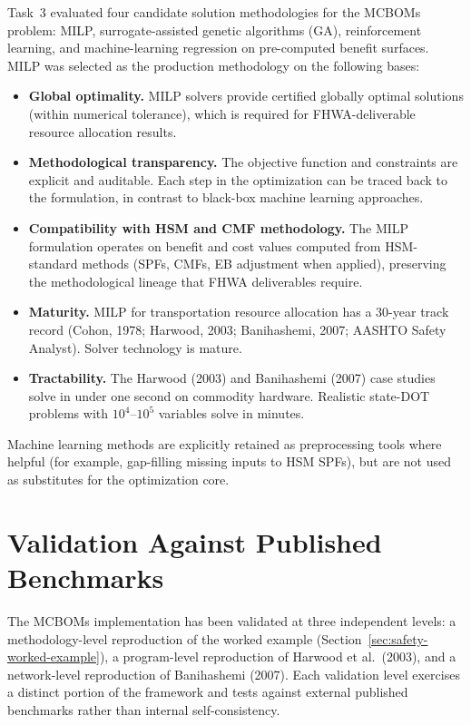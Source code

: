 Task~3 evaluated four candidate solution methodologies for the MCBOMs
problem: MILP, surrogate-assisted genetic algorithms (GA), reinforcement
learning, and machine-learning regression on pre-computed benefit surfaces.
MILP was selected as the production methodology on the following bases:

\begin{itemize}[leftmargin=2em, itemsep=2pt]
  \item \textbf{Global optimality.} MILP solvers provide certified globally
    optimal solutions (within numerical tolerance), which is required for
    FHWA-deliverable resource allocation results.
  \item \textbf{Methodological transparency.} The objective function and
    constraints are explicit and auditable. Each step in the optimization
    can be traced back to the formulation, in contrast to black-box machine
    learning approaches.
  \item \textbf{Compatibility with HSM and CMF methodology.} The MILP
    formulation operates on benefit and cost values computed from
    HSM-standard methods (SPFs, CMFs, EB adjustment when applied),
    preserving the methodological lineage that FHWA deliverables require.
  \item \textbf{Maturity.} MILP for transportation resource allocation has
    a 30-year track record (Cohon, 1978; Harwood, 2003; Banihashemi, 2007;
    AASHTO Safety Analyst). Solver technology is mature.
  \item \textbf{Tractability.} The Harwood (2003) and Banihashemi (2007)
    case studies solve in under one second on commodity hardware. Realistic
    state-DOT problems with $10^4$--$10^5$ variables solve in minutes.
\end{itemize}

Machine learning methods are explicitly retained as preprocessing tools
where helpful (for example, gap-filling missing inputs to HSM SPFs), but are
not used as substitutes for the optimization core.

\section{Validation Against Published Benchmarks}
\label{sec:validation}

The MCBOMs implementation has been validated at three independent levels: a
methodology-level reproduction of the worked example
(Section~\ref{sec:safety-worked-example}), a program-level reproduction of
Harwood et al.~(2003), and a network-level reproduction of Banihashemi
(2007). Each validation level exercises a distinct portion of the framework
and tests against external published benchmarks rather than internal
self-consistency.

